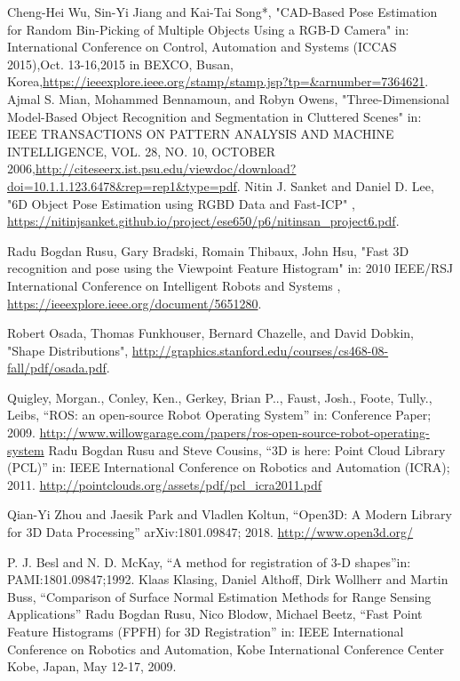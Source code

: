 \label{chap:biblio}
\begin{thebibliography}{1}
		Cheng-Hei Wu, Sin-Yi Jiang and Kai-Tai Song*,
		"CAD-Based Pose Estimation for Random Bin-Picking of Multiple Objects Using a RGB-D Camera" in: International Conference on Control, Automation and Systems (ICCAS 2015),Oct. 13-16,2015 in BEXCO, Busan, Korea,\url{https://ieeexplore.ieee.org/stamp/stamp.jsp?tp=&arnumber=7364621}.
		Ajmal S. Mian, Mohammed Bennamoun, and Robyn Owens,
		"Three-Dimensional Model-Based Object Recognition and Segmentation in Cluttered Scenes" in: IEEE TRANSACTIONS ON PATTERN ANALYSIS AND MACHINE INTELLIGENCE,  VOL. 28,  NO. 10,  OCTOBER 2006,\url{http://citeseerx.ist.psu.edu/viewdoc/download?doi=10.1.1.123.6478&rep=rep1&type=pdf}.
		Nitin J. Sanket and Daniel D. Lee,
		"6D  Object  Pose  Estimation  using  RGBD  Data  and  Fast-ICP" , \url{https://nitinjsanket.github.io/project/ese650/p6/nitinsan_project6.pdf}.


		Radu Bogdan Rusu, Gary Bradski, Romain Thibaux, John Hsu,
		"Fast 3D recognition and pose using the Viewpoint Feature Histogram" in: 2010 IEEE/RSJ International Conference on Intelligent Robots and Systems , \url{https://ieeexplore.ieee.org/document/5651280}.

		Robert Osada, Thomas Funkhouser, Bernard Chazelle, and David Dobkin,
		"Shape Distributions", \url{http://graphics.stanford.edu/courses/cs468-08-fall/pdf/osada.pdf}.


		Quigley, Morgan., Conley, Ken., Gerkey, Brian P.., Faust, Josh., Foote, Tully., Leibs,
		``ROS: an open-source Robot Operating System'' in: Conference Paper; 2009. \url{http://www.willowgarage.com/papers/ros-open-source-robot-operating-system}	
		Radu Bogdan Rusu and Steve Cousins,
		``3D is here: Point Cloud Library (PCL)'' in: IEEE International Conference on Robotics and Automation (ICRA); 2011. \url{http://pointclouds.org/assets/pdf/pcl_icra2011.pdf}
	
	Qian-Yi Zhou and Jaesik Park and Vladlen Koltun,
	``{Open3D}: {A} Modern Library for {3D} Data Processing'' arXiv:1801.09847; 2018. \url{http://www.open3d.org/}

		P. J. Besl and N. D. McKay,
		``A method for registration of 3-D shapes''in: PAMI:1801.09847;1992.
		Klaas Klasing, Daniel Althoff, Dirk Wollherr and Martin Buss,
		``Comparison of  Surface Normal Estimation  Methods for Range Sensing Applications'' 
		Radu Bogdan Rusu, Nico Blodow, Michael Beetz,
		``Fast Point Feature Histograms (FPFH) for 3D Registration'' in: IEEE International Conference on Robotics and Automation, Kobe International Conference Center Kobe, Japan, May 12-17, 2009.
		

\end{thebibliography}
